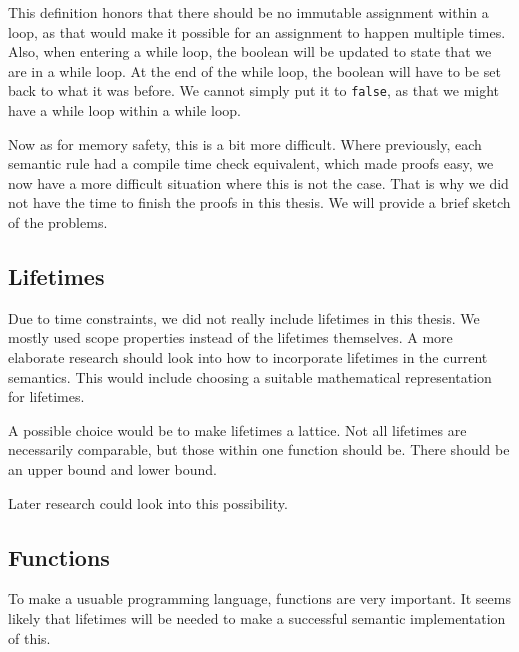This definition honors that there should be no immutable assignment within a loop, as that would make it possible for an assignment to happen multiple times. Also, when entering a while loop, the boolean will be updated to state that we are in a while loop. At the end of the while loop, the boolean will have to be set back to what it was before. We cannot simply put it to \texttt{false}, as that we might have a while loop within a while loop. 

Now as for memory safety, this is a bit more difficult. Where previously, each semantic rule had a compile time check equivalent, which made proofs easy, we now have a more difficult situation where this is not the case. That is why we did not have the time to finish the proofs in this thesis. We will provide a brief sketch of the problems. 


\subsection{Lifetimes}
Due to time constraints, we did not really include lifetimes in this thesis. We mostly used scope properties instead of the lifetimes themselves. A more elaborate research should look into how to incorporate lifetimes in the current semantics. This would include choosing a suitable mathematical representation for lifetimes. 

A possible choice would be to make lifetimes a lattice. Not all lifetimes are necessarily comparable, but those within one function should be. There should be an upper bound and lower bound. 

Later research could look into this possibility. 

\subsection{Functions}
To make a usuable programming language, functions are very important. It seems likely that lifetimes will be needed to make a successful semantic implementation of this. 

